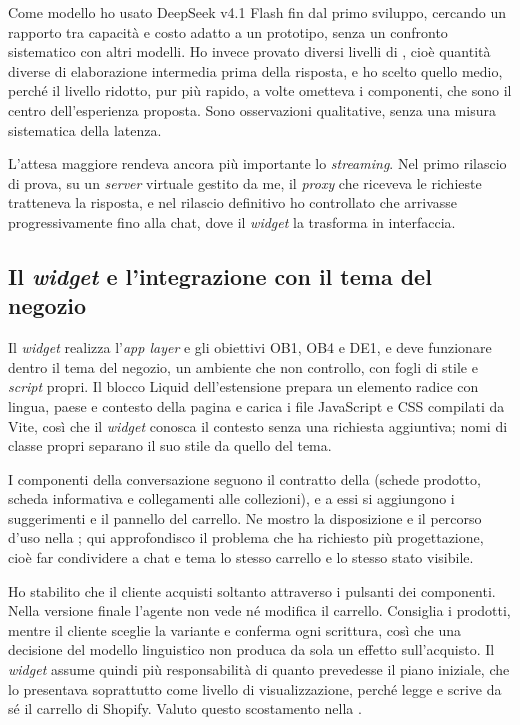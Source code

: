 Come modello ho usato DeepSeek v4.1 Flash fin dal primo sviluppo, cercando un rapporto tra
capacità e costo adatto a un prototipo, senza un confronto sistematico con altri modelli. Ho invece
provato diversi livelli di , cioè quantità diverse di
elaborazione intermedia prima della risposta, e ho scelto quello medio, perché il livello ridotto,
pur più rapido, a volte ometteva i componenti, che sono il centro dell’esperienza proposta. Sono
osservazioni qualitative, senza una misura sistematica della latenza.

L’attesa maggiore rendeva ancora più importante lo \emph{streaming}. Nel primo rilascio di prova,
su un \emph{server} virtuale gestito da me, il \emph{proxy} che riceveva le richieste tratteneva la
risposta, e nel rilascio definitivo ho
controllato che arrivasse progressivamente fino alla chat, dove il \emph{widget} la trasforma in
interfaccia.

\subsection{Il \emph{widget} e l’integrazione con il tema del negozio}
\label{sec:widget}

Il \emph{widget} realizza l’\emph{app layer} e gli obiettivi OB1, OB4 e DE1, e deve funzionare
dentro il tema del negozio, un ambiente che non controllo, con fogli di stile e \emph{script}
propri. Il blocco Liquid dell’estensione prepara un elemento radice con lingua, paese e
contesto della pagina e carica i file JavaScript e CSS compilati da Vite, così che il \emph{widget}
conosca il contesto senza una richiesta aggiuntiva; nomi di classe propri separano il suo stile da
quello del tema.

I componenti della conversazione seguono il contratto della  (schede
prodotto, scheda informativa e collegamenti alle collezioni), e a essi si aggiungono i suggerimenti
e il pannello del carrello. Ne mostro la disposizione e il percorso d’uso nella
; qui approfondisco il problema che ha richiesto più progettazione,
cioè far condividere a chat e tema lo stesso carrello e lo stesso stato visibile.

Ho stabilito che il cliente acquisti soltanto attraverso i pulsanti dei componenti. Nella versione
finale l’agente non vede né modifica il carrello. Consiglia i prodotti, mentre il cliente sceglie
la variante e conferma ogni
scrittura, così che una decisione del modello linguistico non produca da sola un effetto
sull’acquisto. Il \emph{widget} assume quindi più responsabilità di quanto prevedesse il piano
iniziale, che lo presentava soprattutto come livello di visualizzazione, perché legge e scrive da
sé il carrello di Shopify. Valuto questo scostamento nella .

